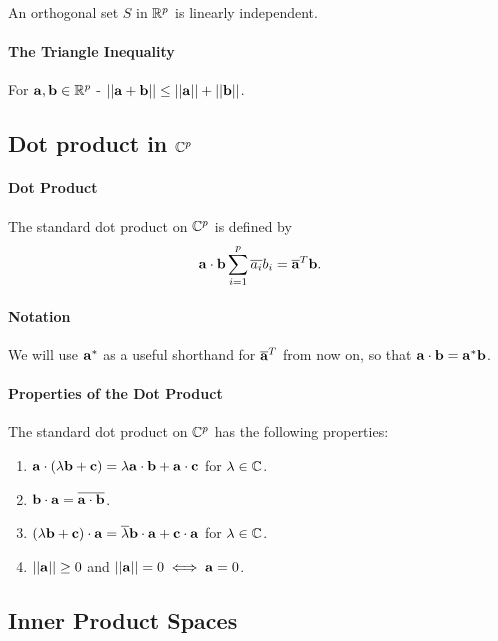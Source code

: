 An orthogonal set \(S\) in \(\mathbb{R}^p\) is linearly independent.

\paragraph{The Triangle Inequality}
For \(\mathbf{a}, \mathbf{b} \in \mathbb{R}^p\) - \(||\mathbf{a} + \mathbf{b}|| \leq ||\mathbf{a}|| + ||\mathbf{b}||\).

\subsection{Dot product in \texorpdfstring{\(\mathbb{C}^p\)}{C\textasciicircum p}}
\paragraph{Dot Product}
The standard dot product on \(\mathbb{C}^p\) is defined by
\[\mathbf{a} \cdot \mathbf{b} \sum_{i=1}^p \overline{a_i}b_i = \overline{\mathbf{a}}^T \mathbf{b}.\]

\paragraph{Notation}
We will use \(\mathbf{a}^*\) as a useful shorthand for \(\overline{\mathbf{a}}^T\) from now on, so that \(\mathbf{a} \cdot \mathbf{b} = \mathbf{a}^*\mathbf{b}\).

\paragraph{Properties of the Dot Product}
The standard dot product on \(\mathbb{C}^p\) has the following properties:
\begin{enumerate}
    \item \(\mathbf{a} \cdot (\lambda\mathbf{b} + \mathbf{c}) = \lambda\mathbf{a} \cdot \mathbf{b} + \mathbf{a} \cdot \mathbf{c}\) for \(\lambda \in \mathbb{C}\).
    \item \(\mathbf{b} \cdot \mathbf{a} = \overline{\mathbf{a} \cdot \mathbf{b}}\).
    \item \((\lambda\mathbf{b} + \mathbf{c}) \cdot \mathbf{a} = \overline{\lambda}\mathbf{b} \cdot \mathbf{a} + \mathbf{c} \cdot \mathbf{a}\) for \(\lambda \in \mathbb{C}\).
    \item \(||\mathbf{a}|| \geq 0\) and \(||\mathbf{a}|| = 0 \iff \mathbf{a} = 0\).
\end{enumerate}

\subsection{Inner Product Spaces}
